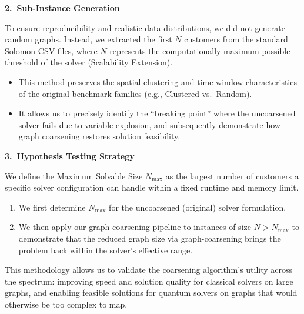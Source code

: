 \documentclass[conference]{IEEEtran}
\begin{document}
\textbf{2.\ Sub-Instance Generation}

To ensure reproducibility and realistic data distributions, we did not generate random graphs. Instead, we extracted the first $N$ customers from the standard Solomon CSV files, where $N$ represents the computationally maximum possible threshold of the solver (Scalability Extension). 

\begin{itemize}
    \item This method preserves the spatial clustering and time-window characteristics of the original benchmark families (e.g., Clustered vs.\ Random).
    \item It allows us to precisely identify the ``breaking point'' where the uncoarsened solver fails due to variable explosion, and subsequently demonstrate how graph coarsening restores solution feasibility.
\end{itemize}

\textbf{3.\ Hypothesis Testing Strategy}

 We define the Maximum Solvable Size $N_{\max}$ as the largest number of customers a specific solver configuration can handle within a fixed runtime and memory limit.

\begin{enumerate}
    \item We first determine $N_{\max}$ for the uncoarsened (original) solver formulation.
    \item We then apply our graph coarsening pipeline to instances of size $N > N_{\max}$  to demonstrate that the reduced graph size via graph-coarsening brings the problem back within the solver's effective range.
\end{enumerate}

This methodology allows us to validate the coarsening algorithm's utility across the spectrum: improving speed and solution quality for classical solvers on large graphs, and enabling feasible solutions for quantum solvers on graphs that would otherwise be too complex to map.
\end{document}
